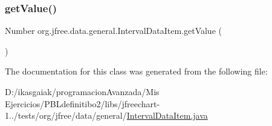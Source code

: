 \mbox{\label{classorg_1_1jfree_1_1data_1_1general_1_1_interval_data_item_ad31563fc52d9e88fb0869643d3560e64}} 
\subsubsection{\texorpdfstring{get\+Value()}{getValue()}}
{\footnotesize\ttfamily Number org.\+jfree.\+data.\+general.\+Interval\+Data\+Item.\+get\+Value (\begin{DoxyParamCaption}{ }\end{DoxyParamCaption})}



The documentation for this class was generated from the following file\+:\begin{DoxyCompactItemize}
\item 
D\+:/ikasgaiak/programacion\+Avanzada/\+Mis Ejercicios/\+P\+B\+Ldefinitibo2/libs/jfreechart-\/1../tests/org/jfree/data/general/\mbox{\hyperlink{_interval_data_item_8java}{Interval\+Data\+Item.\+java}}\end{DoxyCompactItemize}
